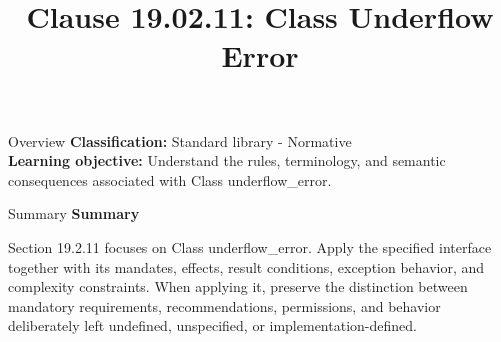 \documentclass[10pt,letterpaper]{article}
\title{Clause 19.02.11: Class Underflow Error}
\author{}
\date{}
\begin{document}
\maketitle
\begin{CornellOverviewBox}{Overview}
\textbf{Classification:} Standard library - Normative\\[2pt]
\textbf{Learning objective:} Understand the rules, terminology, and semantic consequences associated with Class underflow\_error.
\end{CornellOverviewBox}\begin{CornellSummaryBox}{Summary}
{\sffamily\bfseries\color{Accent} Summary}\par\vspace{3pt}Section 19.2.11 focuses on Class underflow\_error. Apply the specified interface together with its mandates, effects, result conditions, exception behavior, and complexity constraints. When applying it, preserve the distinction between mandatory requirements, recommendations, permissions, and behavior deliberately left undefined, unspecified, or implementation-defined.
\end{CornellSummaryBox}
\end{document}
